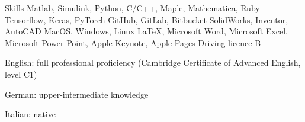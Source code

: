 
\begin{rubric}{Skills}
	Matlab, Simulink, Python, C/C++, Maple, Mathematica, Ruby
	Tensorflow, Keras, PyTorch
	GitHub, GitLab, Bitbucket
    SolidWorks, Inventor, AutoCAD
    MacOS, Windows, Linux
    \LaTeX, Microsoft Word, Microsoft Excel, Microsoft Power-Point, Apple Keynote, Apple Pages
\entry*[Others]
	Driving licence B
\entry*[Languages]
	\par English: full professional proficiency (Cambridge Certificate of Advanced English, level C1)
    \par German: upper-intermediate knowledge
    \par Italian: native
\end{rubric}
